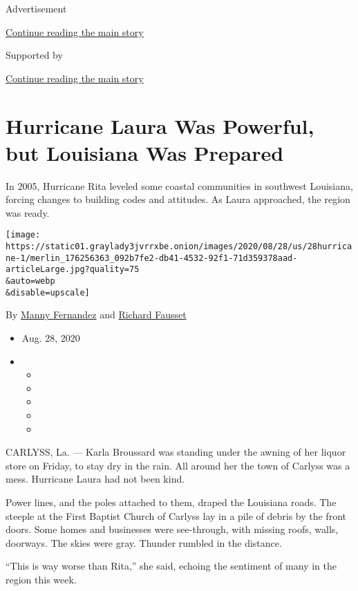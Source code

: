 Advertisement

\protect\hyperlink{after-top}{Continue reading the main story}

Supported by

\protect\hyperlink{after-sponsor}{Continue reading the main story}

\hypertarget{hurricane-laura-was-powerful-but-louisiana-was-prepared}{%
\section{Hurricane Laura Was Powerful, but Louisiana Was
Prepared}\label{hurricane-laura-was-powerful-but-louisiana-was-prepared}}

In 2005, Hurricane Rita leveled some coastal communities in southwest
Louisiana, forcing changes to building codes and attitudes. As Laura
approached, the region was ready.

\texttt{[image: https://static01.graylady3jvrrxbe.onion/images/2020/08/28/us/28hurricane-1/merlin\_176256363\_092b7fe2-db41-4532-92f1-71d359378aad-articleLarge.jpg?quality=75\\\&auto=webp\\\&disable=upscale]}

By \href{https://www.nytimes3xbfgragh.onion/by/manny-fernandez}{Manny
Fernandez} and
\href{https://www.nytimes3xbfgragh.onion/by/richard-fausset}{Richard
Fausset}

\begin{itemize}
\item
  Aug. 28, 2020
\item
  \begin{itemize}
  \item
  \item
  \item
  \item
  \item
  \end{itemize}
\end{itemize}

CARLYSS, La. --- Karla Broussard was standing under the awning of her
liquor store on Friday, to stay dry in the rain. All around her the town
of Carlyss was a mess. Hurricane Laura had not been kind.

Power lines, and the poles attached to them, draped the Louisiana roads.
The steeple at the First Baptist Church of Carlyss lay in a pile of
debris by the front doors. Some homes and businesses were see-through,
with missing roofs, walls, doorways. The skies were gray. Thunder
rumbled in the distance.

``This is way worse than Rita,'' she said, echoing the sentiment of many
in the region this week.


